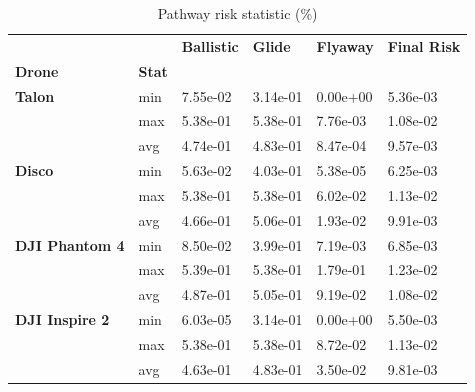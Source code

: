 \documentclass[12pt]{report}
\begin{document}
    \begin{table}[H]
        \centering
        \begin{tabular}{|l l l l l l |}
            \hline
                  &  & \textbf{Ballistic} & \textbf{Glide} & \textbf{Flyaway} & \textbf{Final Risk} \\
            \textbf{Drone} &\textbf{Stat}  &  &  &  &  \\
            \hline
            \textbf{Talon} & min & 7.55e-02 & 3.14e-01 & 0.00e+00 & 5.36e-03 \\
                           & max & 5.38e-01 & 5.38e-01 & 7.76e-03 & 1.08e-02 \\
                           & avg & 4.74e-01 & 4.83e-01 & 8.47e-04 & 9.57e-03 \\
            \hline
            \textbf{Disco} & min & 5.63e-02 & 4.03e-01 & 5.38e-05 & 6.25e-03 \\
                           & max & 5.38e-01 & 5.38e-01 & 6.02e-02 & 1.13e-02 \\
                           & avg & 4.66e-01 & 5.06e-01 & 1.93e-02 & 9.91e-03 \\
            \hline
            \textbf{DJI Phantom 4} & min & 8.50e-02 & 3.99e-01 & 7.19e-03 & 6.85e-03 \\
                                    & max & 5.39e-01 & 5.38e-01 & 1.79e-01 & 1.23e-02 \\
                                    & avg & 4.87e-01 & 5.05e-01 & 9.19e-02 & 1.08e-02 \\
            \hline
            \textbf{DJI Inspire 2} & min & 6.03e-05 & 3.14e-01 & 0.00e+00 & 5.50e-03 \\
                                    & max & 5.38e-01 & 5.38e-01 & 8.72e-02 & 1.13e-02 \\
                                    & avg & 4.63e-01 & 4.83e-01 & 3.50e-02 & 9.81e-03 \\
            \hline
        \end{tabular}
        \captionsetup{justification=justified} %
        \caption{Pathway risk statistic (\%)} %
        \label{tab:pathway-risk}
    \end{table}
\end{document}
